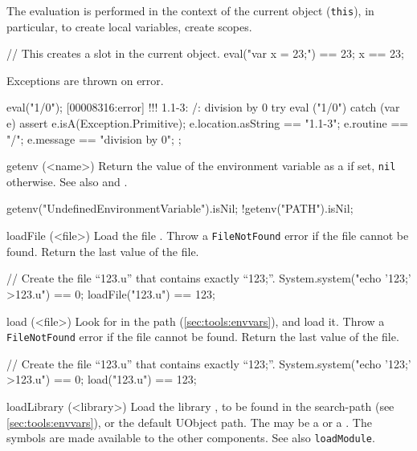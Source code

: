 \begin{urbiscriptapi}
  The evaluation is performed in the context of the current object
  (\lstinline|this|), in particular, to create local variables, create
  scopes.
\begin{urbiassert}
// This creates a slot in the current object.
eval("var x = 23;") == 23;
x == 23;
\end{urbiassert}

  Exceptions are thrown on error.
\begin{urbiscript}
eval("1/0");
[00008316:error] !!! 1.1-3: /: division by 0
try
{
  eval ("1/0")
}
catch (var e)
{
  assert
  {
    e.isA(Exception.Primitive);
    e.location.asString  == "1.1-3";
    e.routine            == "/";
    e.message            == "division by 0";
  }
};
\end{urbiscript}

\item[getenv](<name>)%
  Return the value of the environment variable  as a
   if set, \lstinline|nil| otherwise.  See also
   and .
\begin{urbiassert}
getenv("UndefinedEnvironmentVariable").isNil;
!getenv("PATH").isNil;
\end{urbiassert}

\item[loadFile](<file>)%
  Load the \us file .  Throw a \lstinline|FileNotFound|
  error if the file cannot be found.  Return the last value of the
  file.
\begin{urbiassert}
// Create the file ``123.u'' that contains exactly ``123;''.
System.system("echo '123;' >123.u") == 0;
loadFile("123.u") == 123;
\end{urbiassert}

\item[load](<file>)%
  Look for  in the \urbi path (\autoref{sec:tools:envvars}),
  and load it.  Throw a \lstinline|FileNotFound| error if the file
  cannot be found.  Return the last value of the file.
\begin{urbiassert}
// Create the file ``123.u'' that contains exactly ``123;''.
System.system("echo '123;' >123.u") == 0;
load("123.u") == 123;
\end{urbiassert}

\item[loadLibrary](<library>)%
  Load the library , to be found in the
   search-path (see
  \autoref{sec:tools:envvars}), or the default UObject path.
  The  may be a  or a .
  The \Cxx symbols are made available to the other \Cxx components.  See also
  \lstinline|loadModule|.


\end{urbiscriptapi}

